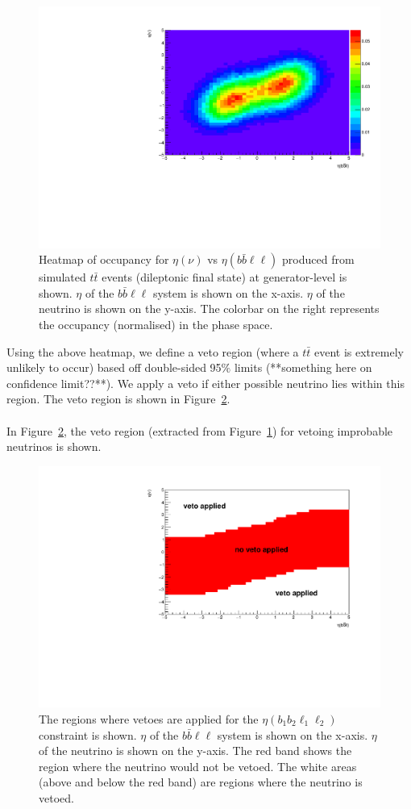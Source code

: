  \begin{figure}[h!]
	\includegraphics[width=0.7\linewidth]{figures/bbll_occ_2vSM.pdf}
	\centering
	\caption{Heatmap of occupancy for $\eta (\nu)$ vs $\eta(b\bar{b}\ell\ell)$ produced from simulated $t\bar{t}$ events (dileptonic final state) at generator-level is shown. $\eta$ of the $b\bar{b}\ell\ell$ system is shown on the x-axis. $\eta$ of the neutrino is shown on the y-axis. The colorbar on the right represents the occupancy (normalised) in the phase space.}
	\label{fig:eta-bbll-heatmap}
\end{figure}

Using the above heatmap, we define a veto region (where a $t\bar{t}$ event is extremely unlikely to occur) based off double-sided 95$\%$ limits (**something here on confidence limit??**). We apply a veto if either possible neutrino lies within this region. The veto region is shown in Figure~\ref{fig:eta-bbll-vetoes}.\\\\

In Figure~\ref{fig:eta-bbll-vetoes}, the veto region (extracted from Figure~\ref{fig:eta-bbll-heatmap}) for vetoing improbable neutrinos is shown.

\begin{figure}[h!]
	\includegraphics[width=0.7\linewidth]{figures/bbll_veto_2vSM.pdf}
	\centering
	\caption{The regions where vetoes are applied for the $\eta(b_{1}b_{2}\ell_{1}\ell_{2})$ constraint is shown. $\eta$ of the $b\bar{b}\ell\ell$ system is shown on the x-axis. $\eta$ of the neutrino is shown on the y-axis. The red band shows the region where the neutrino would not be vetoed. The white areas (above and below the red band) are regions where the neutrino is vetoed.}
	\label{fig:eta-bbll-vetoes}
\end{figure}

